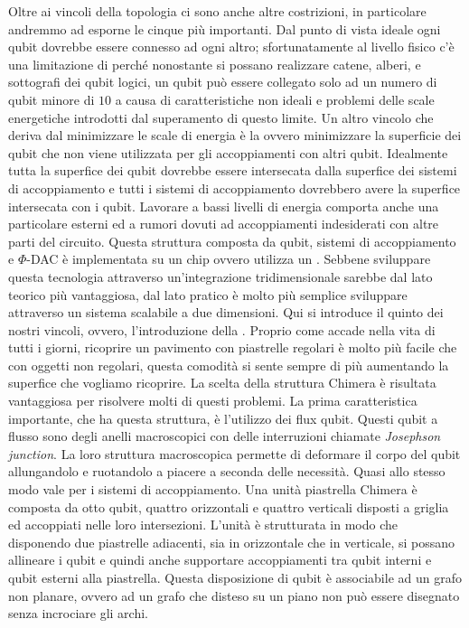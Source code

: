 Oltre ai vincoli della topologia ci sono anche altre costrizioni, in particolare andremmo ad esporne le cinque più importanti. Dal punto di vista ideale ogni qubit dovrebbe essere connesso ad ogni altro; sfortunatamente al livello fisico c'è una limitazione di  perché nonostante si possano realizzare catene, alberi, e sottografi dei qubit logici, un qubit può essere collegato solo ad un numero di qubit minore di $10$ a causa di caratteristiche non ideali e problemi delle scale energetiche introdotti dal superamento di questo limite. Un altro vincolo che deriva dal minimizzare le scale di energia è la  ovvero minimizzare la superficie dei qubit che non viene utilizzata per gli accoppiamenti con altri qubit. Idealmente tutta la superfice dei qubit dovrebbe essere intersecata dalla superfice dei sistemi di accoppiamento e tutti i sistemi di accoppiamento dovrebbero avere la superfice intersecata con i qubit. Lavorare a bassi livelli di energia comporta anche una particolare  esterni ed a rumori dovuti ad accoppiamenti indesiderati con altre parti del circuito. Questa struttura composta da qubit, sistemi di accoppiamento e $\Phi$-DAC è implementata su un chip ovvero utilizza un . Sebbene sviluppare questa tecnologia attraverso un'integrazione tridimensionale sarebbe dal lato teorico più vantaggiosa, dal lato pratico è molto più semplice sviluppare attraverso un sistema scalabile a due dimensioni. Qui si introduce il quinto dei nostri vincoli, ovvero, l'introduzione della . Proprio come accade nella vita di tutti i giorni, ricoprire un pavimento con piastrelle regolari è molto più facile che con oggetti non regolari, questa comodità si sente sempre di più aumentando la superfice che vogliamo ricoprire.
\cite{ACI}La scelta della struttura Chimera è risultata vantaggiosa per risolvere molti di questi problemi. La prima caratteristica importante, che ha questa struttura, è l'utilizzo dei flux qubit. Questi qubit a flusso sono degli anelli macroscopici con delle interruzioni chiamate \textit{Josephson junction}. La loro struttura macroscopica permette di deformare il corpo del qubit allungandolo e ruotandolo a piacere a seconda delle necessità. Quasi allo stesso modo vale per i sistemi di accoppiamento. Una unità piastrella Chimera è composta da otto qubit, quattro orizzontali e quattro verticali disposti a griglia ed accoppiati nelle loro intersezioni. L'unità è strutturata in modo che disponendo due piastrelle adiacenti, sia in orizzontale che in verticale, si possano allineare i qubit e quindi anche supportare accoppiamenti tra qubit interni e qubit esterni alla piastrella. Questa disposizione di qubit è associabile ad un grafo non planare, ovvero ad un grafo che disteso su un piano non può essere disegnato senza incrociare gli archi.

